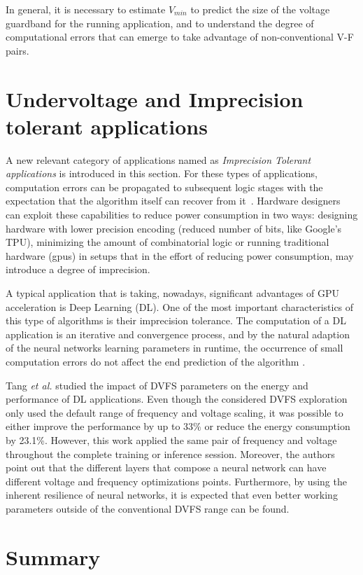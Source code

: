 In general, it is necessary to estimate $V_{min}$ to predict the size of the voltage guardband for the running application, and to understand the degree of computational errors that can emerge to take advantage of non-conventional V-F pairs.

\section{Undervoltage and Imprecision tolerant applications}

A new relevant category of applications named as \textit{Imprecision Tolerant applications} is introduced in this section. For these types of applications, computation errors can be propagated to subsequent logic stages with the expectation that the algorithm itself can recover from it~\cite{nakhaee_lifetime_2018}. Hardware designers can exploit these capabilities to reduce power consumption in two ways: designing hardware with lower precision encoding (reduced number of bits, like Google's TPU), minimizing the amount of combinatorial logic or running traditional hardware (\acrshort{gpu}s) in setups that in the effort of reducing power consumption, may introduce a degree of imprecision.

A typical application that is taking, nowadays, significant advantages of GPU acceleration is Deep Learning (DL). One of the most important characteristics of this type of algorithms is their imprecision tolerance. The computation of a DL application is an iterative and convergence process, and by the natural adaption of the neural networks learning parameters in runtime, the occurrence of small computation errors do not affect the end prediction of the algorithm \cite{jiao_assessment_2017}.

Tang \textit{et al.} \cite{tang_impact_2019} studied the impact of DVFS parameters on the energy and performance of DL applications. Even though the considered DVFS exploration only used the default range of frequency and voltage scaling, it was possible to either improve the performance by up to 33\% or reduce the energy consumption by 23.1\%. However, this work applied the same pair of frequency and voltage throughout the complete training or inference session. Moreover, the authors point out that the different layers that compose a neural network can have different voltage and frequency optimizations points. Furthermore, by using the inherent resilience of neural networks, it is expected that even better working parameters outside of the conventional DVFS range can be found. 

\section{Summary}